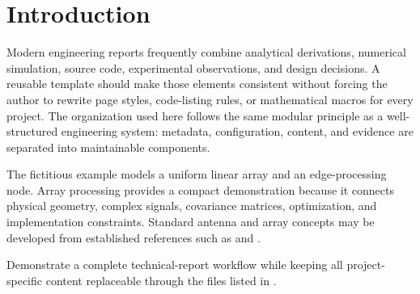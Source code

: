 \section{Introduction}

Modern engineering reports frequently combine analytical derivations, numerical simulation,
source code, experimental observations, and design decisions. A reusable template should make
those elements consistent without forcing the author to rewrite page styles, code-listing rules,
or mathematical macros for every project. The organization used here follows the same modular
principle as a well-structured engineering system: metadata, configuration, content, and evidence
are separated into maintainable components.

The fictitious example models a uniform linear array and an edge-processing node. Array
processing provides a compact demonstration because it connects physical geometry, complex
signals, covariance matrices, optimization, and implementation constraints. Standard antenna
and array concepts may be developed from established references such as
\textcite{stutzman2012} and \textcite{vanTrees2002}.

\begin{objective}
Demonstrate a complete technical-report workflow while keeping all project-specific content
replaceable through the files listed in .
\end{objective}
